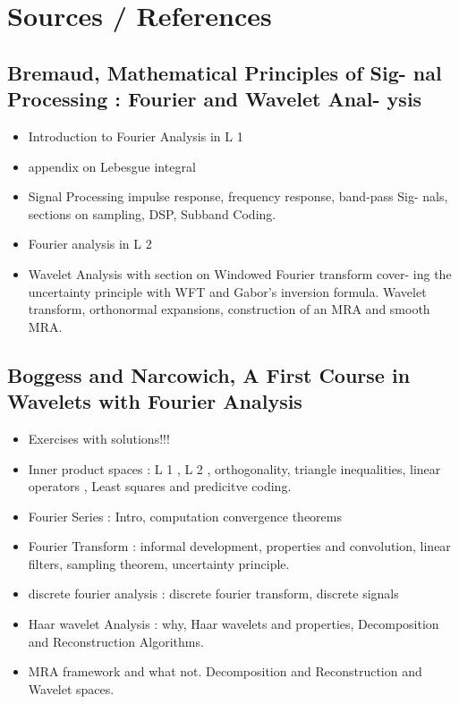\chapter{Sources / References} 
\section{Bremaud, Mathematical Principles of Sig-
nal Processing : Fourier and Wavelet Anal-
ysis}
\label{sec:Bremaud, Mathematical Principles of Sig-
nal Processing : Fourier and Wavelet Anal-
ysis}
\begin{itemize}
  \item Introduction to Fourier Analysis in L 1
  \item appendix on Lebesgue integral
  \item Signal Processing impulse response, frequency response, band-pass Sig-
nals, sections on sampling, DSP, Subband Coding.
  \item Fourier analysis in L 2
  \item Wavelet Analysis with section on Windowed Fourier transform cover-
ing the uncertainty principle with WFT and Gabor’s inversion formula.
Wavelet transform, orthonormal expansions, construction of an MRA and
smooth MRA.
\end{itemize}

\section{Boggess and Narcowich, A First Course in
Wavelets with Fourier Analysis}
\label{sec:Boggess and Narcowich, A First Course in
Wavelets with Fourier Analysis}
\begin{itemize}
  \item Exercises with solutions!!!
  \item Inner product spaces : L 1 , L 2 , orthogonality, triangle inequalities, linear
operators , Least squares and predicitve coding.
  \item Fourier Series : Intro, computation convergence theorems
  \item Fourier Transform : informal development, properties and convolution,
linear filters, sampling theorem, uncertainty principle.
  \item discrete fourier analysis : discrete fourier transform, discrete signals
  \item Haar wavelet Analysis : why, Haar wavelets and properties, Decomposition
and Reconstruction Algorithms.
  \item MRA framework and what not. Decomposition and Reconstruction and
Wavelet spaces. 
\end{itemize}


